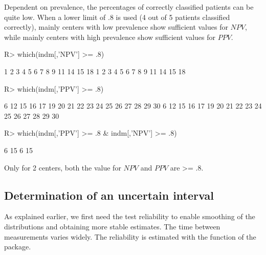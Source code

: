 \documentclass[
  nojss]{jss}
\begin{document}
Dependent on prevalence, the percentages of correctly classified
patients can be quite low. When a lower limit of .8 is used (4 out of 5
patients classified correctly), mainly centers with low prevalence show
sufficient values for \(NPV\), while mainly centers with high prevalence
show sufficient values for \(PPV\).

\begin{CodeChunk}

\begin{CodeInput}
R> which(indm[,'NPV'] >= .8)
\end{CodeInput}

\begin{CodeOutput}
 1  2  3  4  5  6  7  8  9 11 14 15 18 
 1  2  3  4  5  6  7  8  9 11 14 15 18 
\end{CodeOutput}

\begin{CodeInput}
R> which(indm[,'PPV'] >= .8)
\end{CodeInput}

\begin{CodeOutput}
 6 12 15 16 17 19 20 21 22 23 24 25 26 27 28 29 30 
 6 12 15 16 17 19 20 21 22 23 24 25 26 27 28 29 30 
\end{CodeOutput}

\begin{CodeInput}
R> which(indm[,'PPV'] >= .8 & indm[,'NPV'] >= .8)
\end{CodeInput}

\begin{CodeOutput}
 6 15 
 6 15 
\end{CodeOutput}
\end{CodeChunk}

Only for 2 centers, both the value for \(NPV\) and \(PPV\) are
\textgreater= .8.

\hypertarget{determination-of-an-uncertain-interval-1}{%
\subsection{Determination of an uncertain
interval}\label{determination-of-an-uncertain-interval-1}}

As explained earlier, we first need the test reliability to enable
smoothing of the distributions and obtaining more stable estimates. The
time  between measurements varies widely. The reliability is
estimated with the  function of the  package.
\end{document}
